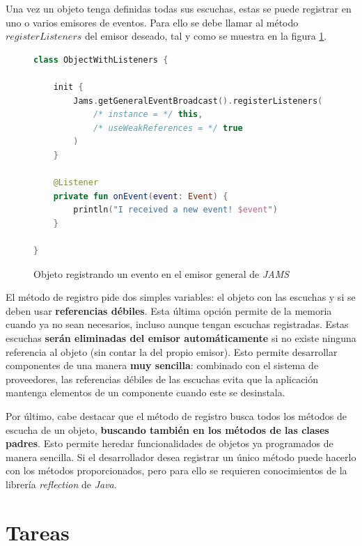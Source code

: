 Una vez un objeto tenga definidas todas sus escuchas, estas
se puede registrar en uno o varios emisores de eventos.
Para ello se debe llamar al método $registerListeners$ del
emisor deseado, tal y como se muestra en la figura \ref{fig:event-registration}.

\begin{figure}[h]
    \centering
    \begin{lstlisting}[frame=single,label={lst:event-registration-use},language=Kotlin]
class ObjectWithListeners {

    init {
        Jams.getGeneralEventBroadcast().registerListeners(
            /* instance = */ this,
            /* useWeakReferences = */ true
        )
    }

    @Listener
    private fun onEvent(event: Event) {
        println("I received a new event! $event")
    }

}
    \end{lstlisting}
    \caption{Objeto registrando un evento en el emisor general de \textit{JAMS}}
    \label{fig:event-registration}
\end{figure}

 El método de registro pide dos simples variables: el objeto
con las escuchas y si se deben usar \textbf{referencias débiles}.
Esta última opción permite  de la memoria
cuando ya no sean necesarios, incluso aunque tengan escuchas registradas.
Estas escuchas \textbf{serán eliminadas del emisor automáticamente} si no existe
ninguna referencia al objeto (sin contar la del propio emisor).
Esto permite desarrollar componentes de una manera \textbf{muy sencilla}:
combinado con el sistema de proveedores, las referencias débiles
de las escuchas evita que la aplicación mantenga elementos de un
componente cuando este se desinstala.

 Por último, cabe destacar que el método de registro
busca todos los métodos de escucha de un objeto,
\textbf{buscando también en los métodos de las clases padres}.
Esto permite heredar funcionalidades de objetos ya programados
de manera sencilla.
Si el desarrollador desea registrar un único método puede hacerlo
con los métodos proporcionados, pero para ello se requieren
conocimientos de la librería \textit{reflection} de \textit{Java}.


\section{Tareas}\label{sec:tareas}

